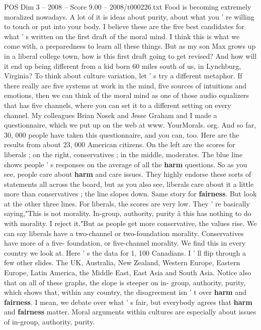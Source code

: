 \begin{textsample}{POS Dim 3 – 2008 – Score 9.00 – 2008/t000226.txt}
Food is becoming extremely moralized nowadays.
A lot of it is ideas about purity, about what you ' re willing to touch or put into your body.
I believe these are the five best candidates for what ' s written on the first draft of the moral mind.
I think this is what we come with, a preparedness to learn all these things.
But as my son Max grows up in a liberal college town, how is this first draft going to get revised?
And how will it end up being different from a kid born 60 miles south of us, in Lynchburg, Virginia?
To think about culture variation, let ' s try a different metaphor.
If there really are five systems at work in the mind, five sources of intuitions and emotions, then we can think of the moral mind as one of those audio equalizers that has five channels, where you can set it to a different setting on every channel.
My colleagues Brian Nosek and Jesse Graham and I made a questionnaire, which we put up on the web at www.
YourMorals. org.
And so far, 30, 000 people have taken this questionnaire, and you can, too.
Here are the results from about 23, 000 American citizens.
On the left are the scores for liberals ; on the right, conservatives ; in the middle, moderates.
The blue line shows people ' s responses on the average of all the \textbf{harm} questions.
So as you see, people care about \textbf{harm} and care issues.
They highly endorse these sorts of statements all across the board, but as you also see, liberals care about it a little more than conservatives ; the line slopes down.
Same story for \textbf{fairness}.
But look at the other three lines.
For liberals, the scores are very low.
They ' re basically saying,"This is not morality.
In-group, authority, purity â this has nothing to do with morality.
I reject it."But as people get more conservative, the values rise.
We can say liberals have a two-channel or two-foundation morality.
Conservatives have more of a five- foundation, or five-channel morality.
We find this in every country we look at.
Here ' s the data for 1, 100 Canadians.
I ' ll flip through a few other slides.
The UK, Australia, New Zealand, Western Europe, Eastern Europe, Latin America, the Middle East, East Asia and South Asia.
Notice also that on all of these graphs, the slope is steeper on in- group, authority, purity, which shows that, within any country, the disagreement isn ' t over \textbf{harm} and \textbf{fairness}.
I mean, we debate over what ' s fair, but everybody agrees that \textbf{harm} and \textbf{fairness} matter.
Moral arguments within cultures are especially about issues of in-group, authority, purity.

\end{textsample}
